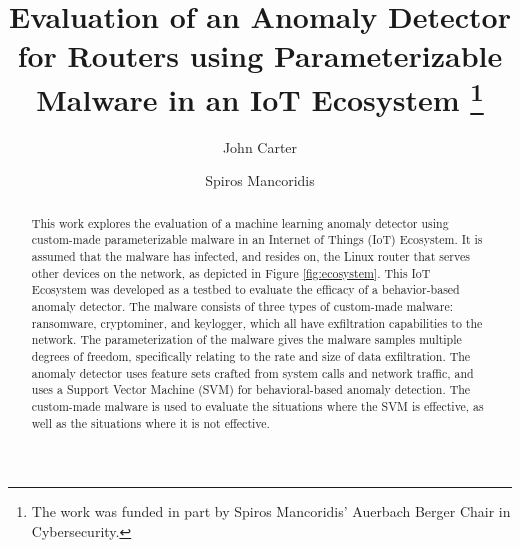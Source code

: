\documentclass[runningheads]{llncs}
\begin{document}
%
\title{Evaluation of an Anomaly Detector for Routers using Parameterizable Malware in an IoT Ecosystem
\thanks{The work was funded in part by Spiros Mancoridis’ Auerbach Berger Chair in Cybersecurity.}}
%
\author{John Carter \and
Spiros Mancoridis}
%
%
%
\maketitle             

\begin{abstract}
This work explores the evaluation of a machine learning anomaly detector using custom-made parameterizable malware in an Internet of Things (IoT) Ecosystem. It is assumed that the malware has infected, and resides on, the Linux router that serves other devices on the network, as depicted in Figure \ref{fig:ecosystem}. This IoT Ecosystem was developed as a testbed to evaluate the efficacy of a behavior-based anomaly detector. The malware consists of three types of custom-made malware: ransomware, cryptominer, and keylogger, which all have exfiltration capabilities to the network. The parameterization of the malware gives the malware samples multiple degrees of freedom, specifically relating to the rate and size of data exfiltration. The anomaly detector uses feature sets crafted from system calls and network traffic, and uses a Support Vector Machine (SVM) for behavioral-based anomaly detection. The custom-made malware is used to evaluate the situations where the SVM is effective, as well as the situations where it is not effective.

\end{abstract}
\end{document}
